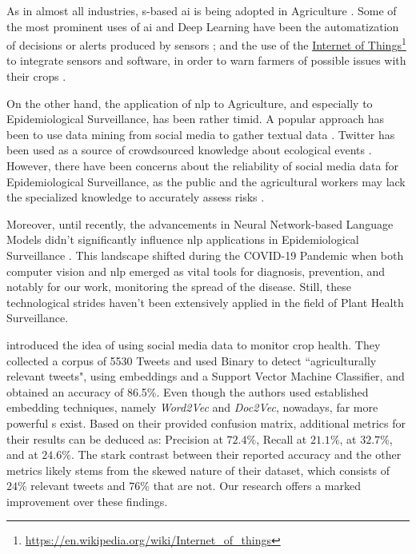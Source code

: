 \label{03_related_work}


As in almost all industries, \neuralNetwork{}s-based \gls{ai} is being adopted in Agriculture . Some of the most prominent uses of \gls{ai} and Deep Learning have been the automatization of decisions or alerts produced by sensors ;  and the use of the \href{https://en.wikipedia.org/wiki/Internet_of_things}{Internet of Things}\footnote{\url{https://en.wikipedia.org/wiki/Internet_of_things}} to integrate sensors and software, in order to warn farmers of possible issues with their crops . 

On the other hand, the application of \gls{nlp} to Agriculture, and especially to Epidemiological Surveillance, has been rather timid. A popular approach has been to use data mining from social media to gather textual data . Twitter has been used as a source of crowdsourced knowledge about ecological events . However, there have been concerns about the reliability of social media data for Epidemiological Surveillance, as the public and the agricultural workers may lack the specialized knowledge to accurately assess risks .


Moreover, until recently, the advancements in Neural Network-based Language Models didn't significantly influence \gls{nlp} applications in Epidemiological Surveillance .
This landscape shifted during the COVID-19 Pandemic when both computer vision and \gls{nlp} emerged as vital tools for diagnosis, prevention, and notably for our work, monitoring the spread of the disease. Still, these technological strides haven't been extensively applied in the field of Plant Health Surveillance.


 introduced the idea of using social media data to monitor crop health. They collected a corpus of 5530 Tweets and used Binary \textclassification{} to detect ``agriculturally relevant tweets", using embeddings and a Support Vector Machine Classifier, and obtained an accuracy of 86.5\%. 
Even though the authors used established embedding techniques, namely \emph{Word2Vec} and \emph{Doc2Vec}, nowadays, far more powerful \neuralNetwork{}s exist.
Based on their provided confusion matrix, additional metrics for their results can be deduced as: Precision at $72.4\%$, Recall at $21.1\%$, \fOne{} at $32.7\%$, and \fTwo{} at $24.6\%$.
 The stark contrast between their reported accuracy and the other metrics likely stems from the skewed nature of their dataset, which consists of $24\%$ relevant tweets and $76\%$ that are not. Our research offers a marked improvement over these findings.


